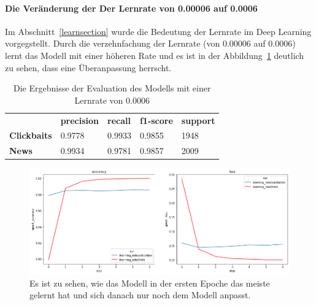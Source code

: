 \paragraph{Die Veränderung der Der Lernrate von 0.00006 auf 0.0006}
Im Abschnitt~\ref{learnsection} wurde die Bedeutung der Lernrate im Deep Learning vorgegstellt. Durch die verzehnfachung der Lernrate (von 0.00006 auf 0.0006) lernt das Modell mit einer höheren Rate und es ist in der Abbildung~\ref{learnpic} deutlich zu sehen, dass eine Überanpassung herrscht. 

\begin{table}[h]
    \caption{Die Ergebnisse der Evaluation des Modells mit einer Lernrate von 0.0006}
    \label{evallearn}
    \renewcommand{\arraystretch}{1.2}
    \centering
    \sffamily
    \begin{footnotesize}
        \begin{tabular}{l l l l l}
            \toprule
                           & \textbf{precision} & \textbf{recall} & \textbf{f1-score} & \textbf{support} \\
            \textbf{Clickbaits} & 0.9778                 & 0.9933                 & 0.9855                & 1948          \\
            \textbf{News}  & 0.9934                 & 0.9781                & 0.9857               & 2009                     \\
            \bottomrule
        \end{tabular}
    \end{footnotesize}
    \rmfamily
\end{table}

\begin{figure}[H]
    \centering
    \includegraphics[width=15cm]{kapitel5/learningrate.png}
    \caption[Auswirkung der Lernrate]{Es ist zu sehen, wie das Modell in der ersten Epoche das meiste gelernt hat und sich danach nur noch dem Modell anpasst.}
    \label{learnpic}
\end{figure}

